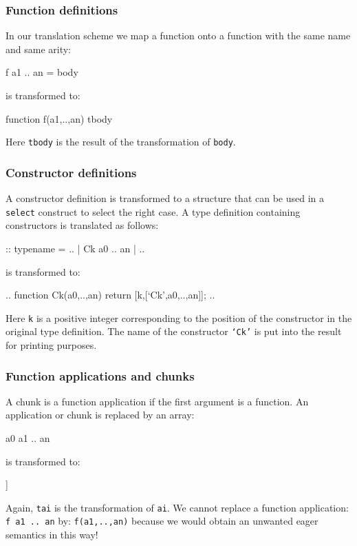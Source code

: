 \subsubsection{Function definitions} 
In our translation scheme we map a \Sapl function onto a \JS function with the same name and same arity:
\begin{CleanCode}
f a1 .. an = body
\end{CleanCode}
is transformed to:
\begin{CleanCode}
function f(a1,..,an) { tbody }
\end{CleanCode}
Here \texttt{tbody} is the result of the transformation of \texttt{body}.

\subsubsection{Constructor definitions} 
A constructor definition is transformed to a structure that can be used in a \texttt{select} construct to 
select the right case. A \Sapl type definition containing constructors is translated as follows:
\begin{CleanCode}
:: typename = .. | Ck a0 .. an | ..
\end{CleanCode}
is transformed to:
\begin{CleanCode}
.. function Ck(a0,..,an) {return [k,[`Ck',a0,..,an]];} ..
\end{CleanCode}
Here \texttt{k} is a positive integer corresponding to the position of the constructor in
the original type definition. The name of the constructor \texttt{`Ck'} is put into the result for printing purposes.


\subsubsection{Function applications and chunks} 
A chunk is a function application if the first argument is a function.
An application or chunk is replaced by an array:
\begin{CleanCode}
a0 a1 .. an 
\end{CleanCode}
is transformed to:
\begin{CleanCode}
[ta0,[ta1,..,tan]]
\end{CleanCode}
Again, \texttt{tai} is the transformation of \texttt{ai}.
We cannot replace a function application: \texttt{f a1 .. an} by: \texttt{f(a1,..,an)} because we would obtain
an unwanted  eager semantics in this way!

